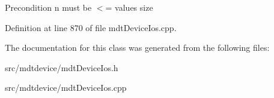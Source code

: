 \begin{DoxyPrecond}{Precondition}
n must be $<$= values size 
\end{DoxyPrecond}


Definition at line 870 of file mdtDeviceIos.cpp.



The documentation for this class was generated from the following files:\begin{DoxyCompactItemize}
\item 
src/mdtdevice/mdtDeviceIos.h\item 
src/mdtdevice/mdtDeviceIos.cpp\end{DoxyCompactItemize}
